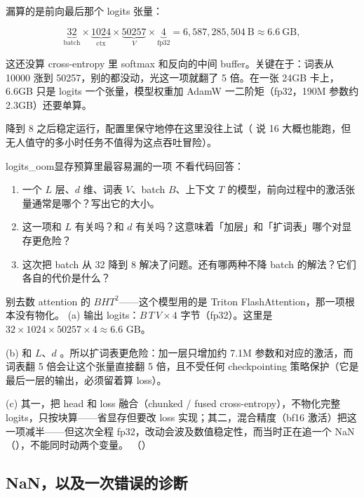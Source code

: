 漏算的是前向最后那个 logits 张量：

\[
\underbrace{32}_{\mbox{batch}} \times \underbrace{1024}_{\mbox{ctx}} \times \underbrace{50257}_{V} \times \underbrace{4}_{\mbox{fp32}}
= 6{,}587{,}285{,}504\ \mbox{B} \approx 6.6\ \mbox{GB},
\]

这还没算 cross-entropy 里 softmax 和反向的中间 buffer。关键在于：词表从 10000 涨到 50257，别的都没动，光这一项就翻了 5 倍。在一张 24GB 卡上，6.6GB 只是 logits 一个张量，模型权重加 AdamW 一二阶矩（fp32，190M 参数约 2.3GB）还要单算。

降到 8 之后稳定运行，配置里保守地停在这里没往上试（ 说 16 大概也能跑，但无人值守的多小时任务不值得为这点吞吐冒险）。

\begin{checkpoint}{logits_oom}{显存预算里最容易漏的一项}
不看代码回答：
\begin{enumerate}[label=(\alph*)]
  \item 一个 $L$ 层、$d$ 维、词表 $V$、batch $B$、上下文 $T$ 的模型，前向过程中的激活张量通常是哪个？写出它的大小。
  \item 这一项和 $L$ 有关吗？和 $d$ 有关吗？这意味着「加层」和「扩词表」哪个对显存更危险？
  \item 这次把 batch 从 32 降到 8 解决了问题。还有哪两种不降 batch 的解法？它们各自的代价是什么？
\end{enumerate}
\hint 别去数 attention 的 $BHT^{2}$——这个模型用的是 Triton FlashAttention，那一项根本没有物化。
\ifshowanswers
\tcblower
\answer (a) 输出 logits：$B\,T\,V\times 4$ 字节（fp32）。这里是 $32\times1024\times50257\times4 \approx 6.6$ GB。

(b) 和 $L$、$d$ 。所以扩词表更危险：加一层只增加约 7.1M 参数和对应的激活，而词表翻 5 倍会让这个张量直接翻 5 倍，且不受任何 checkpointing 策略保护（它是最后一层的输出，必须留着算 loss）。

(c) 其一，把 head 和 loss 融合（chunked / fused cross-entropy），不物化完整 logits，只按块算——省显存但要改 loss 实现；其二，混合精度（bf16 激活）把这一项减半——但这次全程 fp32，改动会波及数值稳定性，而当时正在追一个 NaN（），不能同时动两个变量。
\whereincode {}（）
\fi
\end{checkpoint}

\subsection{NaN，以及一次错误的诊断}
\label{subsec:nan}

